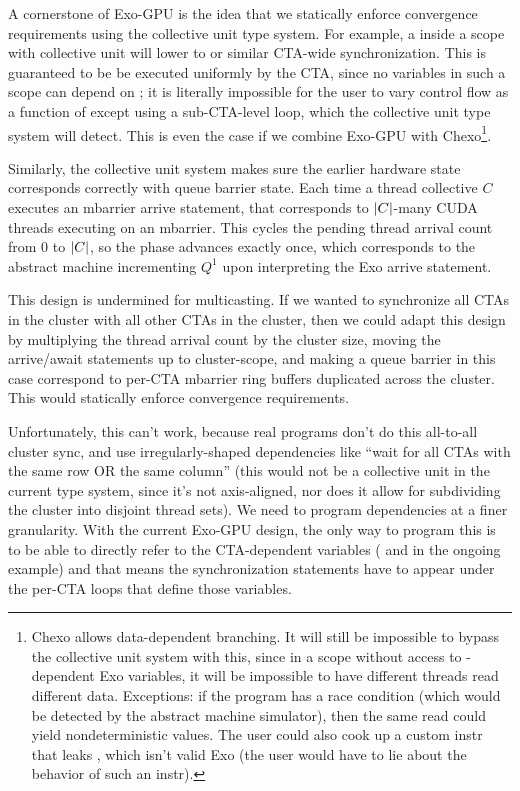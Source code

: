 \filbreak
A cornerstone of Exo-GPU is the idea that we statically enforce convergence requirements using the collective unit type system.
For example, a  inside a scope with collective unit  will lower to  or similar CTA-wide synchronization.
This is guaranteed to be be executed uniformly by the CTA, since no variables in such a scope can depend on ; it is literally impossible for the user to vary control flow as a function of  except using a sub-CTA-level  loop, which the collective unit type system will detect.
This is even the case if we combine Exo-GPU with Chexo\footnote{Chexo allows data-dependent branching. It will still be impossible to bypass the collective unit system with this, since in a scope without access to -dependent Exo variables, it will be impossible to have different threads read different data. Exceptions: if the program has a race condition (which would be detected by the abstract machine simulator), then the same read could yield nondeterministic values. The user could also cook up a custom instr that leaks , which isn't valid Exo (the user would have to lie about the behavior of such an instr).}.

\filbreak
Similarly, the collective unit system makes sure the earlier hardware state corresponds correctly with queue barrier state.
Each time a thread collective $C$ executes an mbarrier arrive statement, that corresponds to $\left \vert C \right\vert$-many CUDA threads executing  on an mbarrier.
This cycles the pending thread arrival count from 0 to $\left \vert C \right\vert$, so the phase advances exactly once, which corresponds to the abstract machine incrementing $Q^1$ upon interpreting the Exo arrive statement.

\filbreak
This design is undermined for multicasting.
If we wanted to synchronize all CTAs in the cluster with all other CTAs in the cluster, then we could adapt this design by multiplying the thread arrival count by the cluster size, moving the arrive/await statements up to cluster-scope, and making a queue barrier in this case correspond to per-CTA mbarrier ring buffers duplicated across the cluster.
This would statically enforce convergence requirements.

\filbreak
Unfortunately, this can't work, because real programs don't do this all-to-all cluster sync, and use irregularly-shaped dependencies like ``wait for all CTAs with the same row OR the same column'' (this would not be a collective unit in the current type system, since it's not axis-aligned, nor does it allow for subdividing the cluster into disjoint thread sets).
We need to program dependencies at a finer granularity.
With the current Exo-GPU design, the only way to program this is to be able to directly refer to the CTA-dependent variables ( and  in the ongoing example) and that means the synchronization statements have to appear under the per-CTA loops that define those variables.

